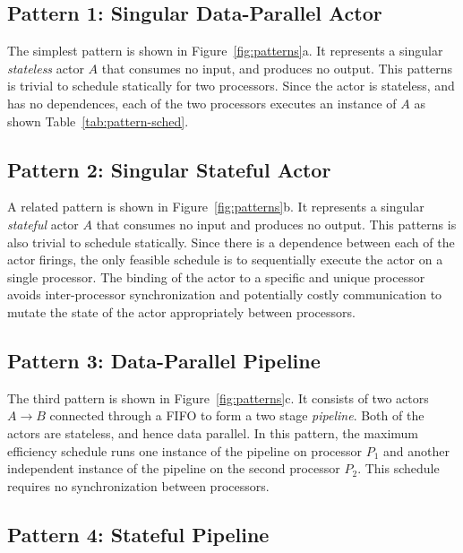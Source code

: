 \subsection{Pattern 1: Singular Data-Parallel Actor}

The simplest pattern is shown in Figure~\ref{fig:patterns}a. It
represents a singular {\it stateless} actor $A$ that consumes no
input, and produces no output.
This patterns is trivial to schedule statically for two
processors. Since the actor is stateless, and has no dependences, each
of the two processors executes an instance of $A$ as shown Table~\ref{tab:pattern-sched}.

\subsection{Pattern 2: Singular Stateful Actor}

A related pattern is shown in Figure~\ref{fig:patterns}b. It
represents a singular {\it stateful} actor $A$ that consumes no input
and produces no output.
This patterns is also trivial to schedule statically. Since there is a
dependence between each of the actor firings, the only feasible
schedule is to sequentially execute the actor on a single
processor. The binding of the actor to a specific and unique
processor avoids inter-processor synchronization and
potentially costly communication to mutate the state of the actor
appropriately between processors.

\subsection{Pattern 3: Data-Parallel Pipeline}

The third pattern is shown in Figure~\ref{fig:patterns}c. It consists
of two actors $A\rightarrow B$ connected through a FIFO to form a two
stage {\it pipeline}. Both of the actors are stateless, and hence data
parallel. In this pattern, the maximum efficiency schedule runs one
instance of the pipeline on processor $P_1$ and another independent
instance of the pipeline on the second processor $P_2$.  This schedule
requires no synchronization between processors.

\subsection{Pattern 4: Stateful Pipeline}

